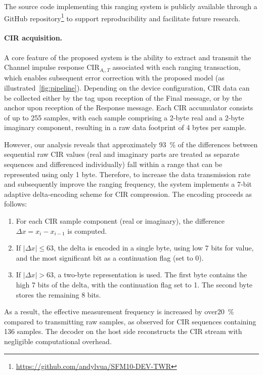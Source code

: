 The source code implementing this ranging system is publicly available through a GitHub repository\footnote{\url{https://github.com/andylvua/SFM10-DEV-TWR}} to support reproducibility and facilitate future research.

\paragraph{CIR acquisition.}

A core feature of the proposed system is the ability to extract and transmit the Channel impulse response $\text{CIR}_{A_i,T}$ associated with each ranging transaction, which enables subsequent error correction with the proposed model (as illustrated~\autoref{fig:pipeline}). Depending on the device configuration, CIR data can be collected either by the tag upon reception of the Final message, or by the anchor upon reception of the Response message. Each CIR accumulator consists of up to 255 samples, with each sample comprising a 2-byte real and a 2-byte imaginary component, resulting in a raw data footprint of 4 bytes per sample.

However, our analysis reveals that approximately \SI{93}{\percent} of the differences between sequential raw CIR values (real and imaginary parts are treated as separate sequences and differenced individually) fall within a range that can be represented using only 1 byte. Therefore, to increase the data transmission rate and subsequently improve the ranging frequency, the system implements a 7-bit adaptive delta-encoding scheme for CIR compression. The encoding proceeds as follows: 

\begin{enumerate} 
    \item For each CIR sample component (real or imaginary), the difference $\Delta x = x_i - x_{i-1}$ is computed. 
    \item If $|\Delta x| \leq 63$, the delta is encoded in a single byte, using low 7 bits for value, and the most significant bit as a continuation flag (set to 0). 
    \item If $|\Delta x| > 63$, a two-byte representation is used. The first byte contains the high 7 bits of the delta, with the continuation flag set to 1. The second byte stores the remaining 8 bits. 
\end{enumerate} 

As a result, the effective measurement frequency is increased by over\SI{20}{\percent} compared to transmitting raw samples, as observed for CIR sequences containing 136 samples. The decoder on the host side reconstructs the CIR stream with negligible computational overhead.

